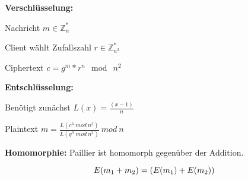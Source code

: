 \documentclass{beamer}
\begin{document}
\begin{frame}
		\textbf{Verschlüsselung:}
		\begin{arrowlist}
			\item Nachricht  $ m \in \mathbb{Z}_{n}^{*} $
			\item Client wählt Zufallszahl $ r  \in \mathbb{Z}_{n^{2}}^{*} $ 
			\item Ciphertext $ c = g^{m}*r^{n} \mod\ n^{2} $
		\end{arrowlist}
		

		\textbf{Entschlüsselung:}
		\begin{arrowlist}
			\item Benötigt zunächst $ L(x)= \frac{(x-1)}{n} $
			\item Plaintext $ m = \frac{L(c^{\lambda} \ mod \ n^{2}) }{L(g^{\lambda} \ mod \ n^{2})} \ mod \ n $
		\end{arrowlist}


		\textbf{Homomorphie:}
		Paillier ist homomorph gegenüber der Addition.
		
		$$ E(m \textsubscript{1} + m \textsubscript{2}) = (E(m \textsubscript{1}) + E(m \textsubscript{2}))$$
\end{frame}
\end{document}
